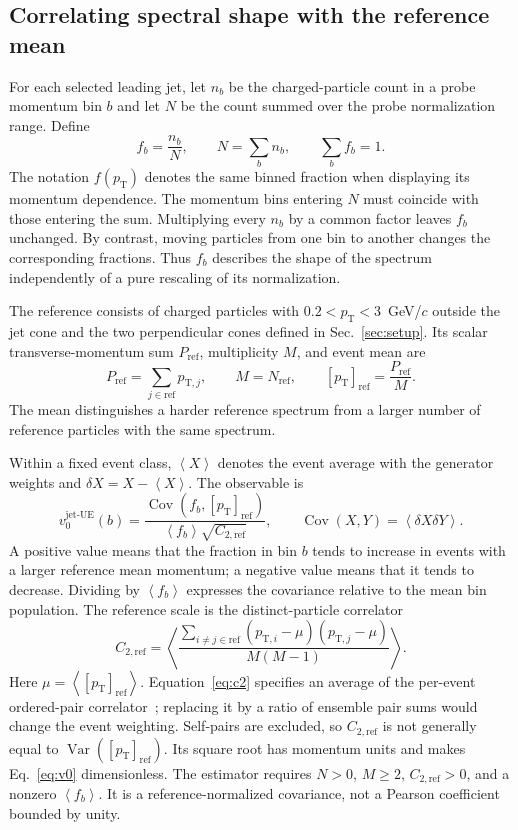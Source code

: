 \documentclass[aps,prc,twocolumn,superscriptaddress,nofootinbib,longbibliography,floatfix,10pt]{revtex4-2}
\newcommand{\pT}{p_{\mathrm T}}
\newcommand{\vjet}{{v_0^{\mathrm{jet\text{-}UE}}}}
\newcommand{\mpt}{[p_{\mathrm T}]_{\mathrm{ref}}}
\newcommand{\Ctwo}{C_{2,\mathrm{ref}}}
\newcommand{\av}[1]{\left\langle #1\right\rangle}
\newcommand{\Cov}{\operatorname{Cov}}
\newcommand{\Var}{\operatorname{Var}}
\begin{document}
\subsection{Correlating spectral shape with the reference mean}
For each selected leading jet, let $n_b$ be the charged-particle count in a probe momentum bin $b$ and let $N$ be the count summed over the probe normalization range. Define
\begin{equation}
 f_b=\frac{n_b}{N},\qquad N=\sum_b n_b,\qquad \sum_b f_b=1.
 \label{eq:f}
\end{equation}
The notation $f(\pT)$ denotes the same binned fraction when displaying its momentum dependence. The momentum bins entering $N$ must coincide with those entering the sum. Multiplying every $n_b$ by a common factor leaves $f_b$ unchanged. By contrast, moving particles from one bin to another changes the corresponding fractions. Thus $f_b$ describes the shape of the spectrum independently of a pure rescaling of its normalization.

The reference consists of charged particles with $0.2<\pT<3$~GeV/$c$ outside the jet cone and the two perpendicular cones defined in Sec.~\ref{sec:setup}. Its scalar transverse-momentum sum $P_{\mathrm{ref}}$, multiplicity $M$, and event mean are
\begin{equation}
 P_{\mathrm{ref}}=\sum_{j\in\mathrm{ref}}p_{\mathrm T,j},\qquad
 M=N_{\mathrm{ref}},\qquad \mpt=\frac{P_{\mathrm{ref}}}{M}.
 \label{eq:ref}
\end{equation}
The mean distinguishes a harder reference spectrum from a larger number of reference particles with the same spectrum.

Within a fixed event class, $\av X$ denotes the event average with the generator weights and $\delta X=X-\av X$. The observable is
\begin{equation}
 \vjet(b)=\frac{\Cov(f_b,\mpt)}{\av{f_b}\sqrt{\Ctwo}},
 \qquad \Cov(X,Y)=\av{\delta X\delta Y}.
 \label{eq:v0}
\end{equation}
A positive value means that the fraction in bin $b$ tends to increase in events with a larger reference mean momentum; a negative value means that it tends to decrease. Dividing by $\av{f_b}$ expresses the covariance relative to the mean bin population. The reference scale is the distinct-particle correlator
\begin{equation}
 \Ctwo=\av{\frac{\sum_{i\ne j\in\mathrm{ref}}
 (p_{\mathrm T,i}-\mu)(p_{\mathrm T,j}-\mu)}{M(M-1)}}.
 \label{eq:c2}
\end{equation}
Here $\mu=\av{\mpt}$. Equation~\eqref{eq:c2} specifies an average of the per-event ordered-pair correlator~\cite{BhattaCumulants}; replacing it by a ratio of ensemble pair sums would change the event weighting. Self-pairs are excluded, so $\Ctwo$ is not generally equal to $\Var(\mpt)$. Its square root has momentum units and makes Eq.~\eqref{eq:v0} dimensionless. The estimator requires $N>0$, $M\ge2$, $\Ctwo>0$, and a nonzero $\av{f_b}$. It is a reference-normalized covariance, not a Pearson coefficient bounded by unity.
\end{document}
